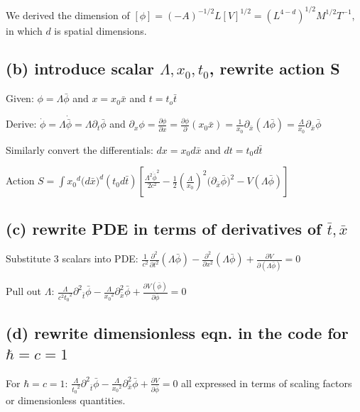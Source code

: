 \documentclass{article}
\begin{document}
\vspace{3mm}
We derived the dimension of 
$[\phi]=(-A)^{-1/2}L[V]^{1/2}=(L^{4-d})^{1/2}M^{1/2}T^{-1}$, in which $d$ is spatial dimensions.

\subsection{(b) introduce scalar $\Lambda, x_0, t_0$, rewrite action S}

Given: $\phi=\Lambda{\bar{\phi}}$ and $x=x_0{\bar{x}}$ and $t=t_o{\bar{t}}$

\vspace{3mm}
Derive: $\dot{\phi}=\Lambda{\dot{\bar\phi}}=\Lambda{\partial_t}{\bar\phi}$ and $\partial_x{\phi}=\frac{\partial\phi}{\partial{x}}=\frac{\partial\phi}{\partial}{{(x_0\bar{x})}}=\frac{1}{x_0}{\partial_\bar{x}}{(\Lambda{\bar\phi})}=\frac{\Lambda}{x_0}{\partial_\bar{x}}{\bar\phi}$

\vspace{3mm}
Similarly convert the differentials: $dx=x_0{d\bar{x}}$ and $dt=t_0{d\bar{t}}$

\vspace{3mm}
Action $S=\int{{x_0}^d{(d\bar{x}})^d{(t_0{d\bar{t}})}[\frac{\Lambda^2{\dot{\bar{\phi}}}^2}{2c^2}-\frac{1}{2}{(\frac{\Lambda}{x_0})^2(\partial_{\bar{x}}{\bar\phi}})^2-V(\Lambda\bar\phi)]}$

\subsection{(c) rewrite PDE in terms of  derivatives of $\bar{t}, \bar{x}$}
Substitute 3 scalars into PDE: $\frac{1}{c^2}{\frac{\partial^2}{\partial{t^2}}(\Lambda\bar\phi)}-\frac{\partial^2}{\partial{x^2}}(\Lambda\bar\phi)+\frac{\partial{V}}{\partial(\Lambda\bar\phi)}=0$

\vspace{3mm}
Pull out $\Lambda$: $\frac{\Lambda}{{c^2}{t_0}^2}{{\partial^2}_{\bar{t}}\bar\phi}-{\frac{\Lambda}{{x_0}^2}{\partial^2_{\bar{x}}}}{\bar\phi}+{\frac{\partial{V(\bar\phi)}}{\partial{\bar\phi}}}=0$


\subsection{(d) rewrite dimensionless eqn. in the code for  $\hbar=c=1$}
For $\hbar=c=1$: 
$\frac{\Lambda}{{t_0}^2}{{\partial^2}_{\bar{t}}\bar\phi}-{\frac{\Lambda}{{x_0}^2}{\partial^2_{\bar{x}}}}{\bar\phi}+{\frac{\partial{V}}{\partial{\bar\phi}}}=0$ all expressed in terms of scaling factors or dimensionless quantities.
\end{document}
